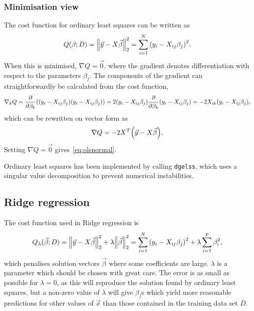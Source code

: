 \documentclass[11pt,british,a4paper]{article}
\numberwithin{equation}{section}
\begin{document}
\subsubsection{Minimisation view}
The cost function for ordinary least squares can be written as
\begin{equation}
    Q(\beta;D) = \norm{\vec{y}-X\vec{\beta}}_2^2
               = \sum_{i=1}^N \qty(y_i - X_{ij}\beta_j)^2.
\end{equation}
When this is minimised, \(\nabla Q = \vec{0}\), where the gradient denotes differentiation with respect to the parameters \(\beta_j\).
The components of the gradient can straightforwardly be calculated from the cost function,
\begin{equation}
    \nabla_k Q = \pdv{\beta_k}(\qty(y_i - X_{ij}\beta_j)\qty(y_i - X_{ij}\beta_j))
               = 2\qty(y_i-X_{ij}\beta_j) \pdv{\beta_k}(y_i-X_{ij}\beta_j)
               = -2X_{ik}\qty(y_i-X_{ij}\beta_j),\label{eq:olsgradcomp}
\end{equation}
which can be rewritten on vector form as
\begin{equation}
    \nabla Q = -2X^T\qty(\vec{y}-X\vec{\beta}).\label{eq:olsgrad}
\end{equation}
Setting \(\nabla Q = \vec{0}\) gives~\vref{eq:olsnormal}.

Ordinary least squares has been implemented by calling \lstinline{dgelss}, which uses a singular value decomposition to prevent numerical instabilities.

\subsection{Ridge regression}
The cost function used in Ridge regression is
\begin{equation}
    Q_\lambda(\vec{\beta};D) = \norm{\vec{y}-X\vec{\beta}}_2^2 + \lambda \norm{\vec{\beta}}_2^2
                             = \sum_{i=1}^N \qty(y_i - X_{ij}\beta_j)^2 + \lambda\sum_{i=1}^p \beta_i^2,
\end{equation}
which penalises solution vectors \(\vec{\beta}\) where some coefficients are large.
\(\lambda\) is a parameter which should be chosen with great care.
The error is as small as possible for \(\lambda=0\), as this will reproduce the solution found by ordinary least squares, but a non-zero value of \(\lambda\) will give \(\beta_j\)s which yield more reasonable predictions for other values of \(\vec{x}\) than those contained in the training data set \(D\)\cite{mehta}.
\end{document}
